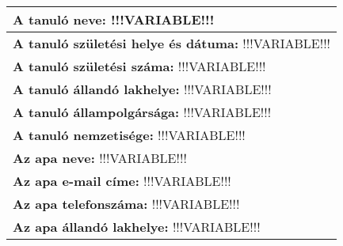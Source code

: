 \documentclass[10pt,a4paper]{article}
\begin{document}
\begin{figure}[!ht]
\begin{tabular}{|m{\textwidth}|}
\hline \vspace{3pt}
\textbf{A tanuló neve:} \hspace{0.5cm} !!!VARIABLE!!! \vspace{3pt} \\
\hline\vspace{3pt}
\textbf{A tanuló születési helye és dátuma:}  \hspace{0.5cm} !!!VARIABLE!!! \vspace{3pt} \\ 
\hline \vspace{3pt}
\textbf{A tanuló születési száma:}  \hspace{0.5cm} !!!VARIABLE!!! \vspace{3pt} \\ 
\hline \vspace{3pt}
\textbf{A tanuló állandó lakhelye:}  \hspace{0.5cm} !!!VARIABLE!!! \vspace{3pt} \\ 
\hline \vspace{3pt}
\textbf{A tanuló állampolgársága:}  \hspace{0.5cm} !!!VARIABLE!!! \vspace{3pt} \\ 
\hline \vspace{3pt}
\textbf{A tanuló nemzetisége:} \hspace{0.5cm} !!!VARIABLE!!! \vspace{3pt} \\ 
\hline \vspace{3pt}
\textbf{Az apa neve:} \hspace{0.5cm} !!!VARIABLE!!! \vspace{3pt} \\ 
\hline \vspace{3pt}
\textbf{Az apa e-mail címe:} \hspace{0.5cm} !!!VARIABLE!!! \vspace{3pt} \\ 
\hline \vspace{3pt}
\textbf{Az apa telefonszáma:} \hspace{0.5cm} !!!VARIABLE!!! \vspace{3pt} \\ 
\hline \vspace{3pt}
\textbf{Az apa állandó lakhelye:} \hspace{0.5cm} !!!VARIABLE!!! \vspace{3pt} \\ 

\end{tabular}
\end{figure}
\end{document}
